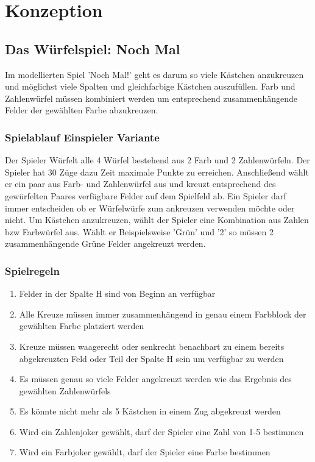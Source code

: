 
\clearpage
\chapter{Konzeption}

\section{Das Würfelspiel: Noch Mal}
Im modellierten Spiel 'Noch Mal!' geht es darum so viele Kästchen anzukreuzen und möglichst viele Spalten und gleichfarbige Kästchen auszufüllen.
Farb und Zahlenwürfel müssen kombiniert werden um entsprechend zusammenhängende Felder der gewählten Farbe abzukreuzen.

\subsection{Spielablauf Einspieler Variante}
Der Spieler Würfelt alle 4 Würfel bestehend aus 2 Farb und 2 Zahlenwürfeln.
Der Spieler hat 30 Züge dazu Zeit maximale Punkte zu erreichen.
Anschließend wählt er ein paar aus Farb- und Zahlenwürfel aus und kreuzt entsprechend des gewürfelten Paares verfügbare Felder auf dem Spielfeld ab.
Ein Spieler darf immer entscheiden ob er Würfelwürfe zum ankreuzen verwenden möchte oder nicht.
Um Kästchen anzukreuzen, wählt der Spieler eine Kombination aus Zahlen bzw Farbwürfel aus. Wählt er Beispielsweise 'Grün' und '2' so müssen 2 zusammenhängende Grüne Felder angekreuzt werden.


\newpage
\subsection{Spielregeln}
\begin{enumerate}
    \item Felder in der Spalte H sind von Beginn an verfügbar
    \item Alle Kreuze müssen immer zusammenhängend in genau einem Farbblock der gewählten Farbe platziert werden
    \item Kreuze müssen waagerecht oder senkrecht benachbart zu einem bereits abgekreuzten Feld oder Teil der Spalte H sein um verfügbar zu werden
    \item Es müssen genau so viele Felder angekreuzt werden wie das Ergebnis des gewählten Zahlenwürfels
    \item Es könnte nicht mehr als 5 Kästchen in einem Zug abgekreuzt werden
    \item Wird ein Zahlenjoker gewählt, darf der Spieler eine Zahl von 1-5 bestimmen
    \item Wird ein Farbjoker gewählt, darf der Spieler eine Farbe bestimmen
\end{enumerate}


